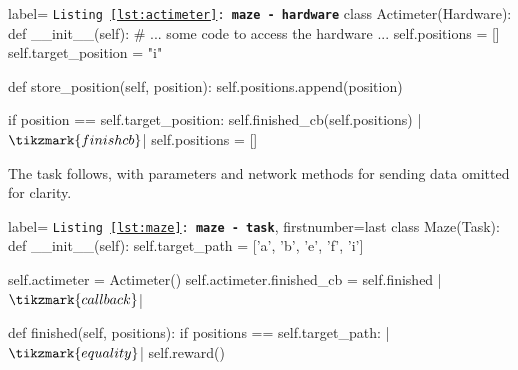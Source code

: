 \begin{listing}[h!]
\begin{pythoncode*}{label= \texttt{Listing \ref{lst:actimeter}: \textbf{maze - hardware}}}
class Actimeter(Hardware):
    def __init__(self):
        # ... some code to access the hardware ...
        self.positions = []
        self.target_position = "i"
        
    def store_position(self, position):
        self.positions.append(position)
        
        if position == self.target_position:
            self.finished_cb(self.positions) |$\tikzmark{finishcb}$|
            self.positions = []
\end{pythoncode*}
\captionlistentry{}%
\label{lst:actimeter}%
\end{listing}%
%
%
The task follows, with parameters and network methods for sending data omitted for clarity.
\begin{listing}[H]
\begin{pythoncode*}{label= \texttt{Listing \ref{lst:maze}: \textbf{maze - task}}, firstnumber=last}
class Maze(Task):
    def __init__(self):
        self.target_path = ['a', 'b', 'e', 'f', 'i']
        
        self.actimeter = Actimeter()
        self.actimeter.finished_cb = self.finished |$\tikzmark{callback}\label{callback}$|
        
    def finished(self, positions):
        if positions == self.target_path: |$\tikzmark{equality}$|
            self.reward()
\end{pythoncode*}
\captionlistentry{}%
\label{lst:maze}%
\end{listing}%
%
\clearpage

